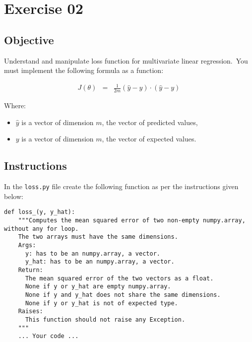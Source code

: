 \chapter{Exercise 02}

\newpage
{}
\makeheaderfilesforbidden

\section*{Objective}
Understand and manipulate loss function for multivariate linear regression.\
You must implement the following formula as a function:  

$$
\begin{matrix}
J(\theta) &  = & \frac{1}{2m}(\hat{y} - y) \cdot(\hat{y}- y)
\end{matrix}
$$  

Where:
\begin{itemize}
  \item $\hat{y}$ is a vector of dimension $m$, the vector of predicted values,
  \item $y$ is a vector of dimension $m$, the vector of expected values.
\end{itemize}


\section*{Instructions}
In the \texttt{loss.py} file create the following function as per the instructions given below:

\begin{verbatim}
def loss_(y, y_hat):
    """Computes the mean squared error of two non-empty numpy.array, without any for loop.
    The two arrays must have the same dimensions.
    Args:
      y: has to be an numpy.array, a vector.
      y_hat: has to be an numpy.array, a vector.
    Return:
      The mean squared error of the two vectors as a float.
      None if y or y_hat are empty numpy.array.
      None if y and y_hat does not share the same dimensions.
      None if y or y_hat is not of expected type.
    Raises:
      This function should not raise any Exception.
    """
    ... Your code ...
\end{verbatim}

